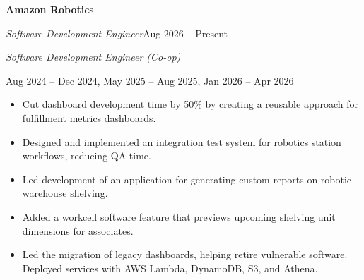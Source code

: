 \textbf{Amazon Robotics}\par
\textit{Software Development Engineer}\enspace\textbar\enspace Aug 2026 -- Present\par
\textit{Software Development Engineer (Co-op)}\par
Aug 2024 -- Dec 2024, May 2025 -- Aug 2025, Jan 2026 -- Apr 2026\par
\begin{itemize}
  \item Cut dashboard development time by 50\% by creating a reusable approach for fulfillment metrics dashboards.
  \item Designed and implemented an integration test system for robotics station workflows, reducing QA time.
  \item Led development of an application for generating custom reports on robotic warehouse shelving.
  \item Added a workcell software feature that previews upcoming shelving unit dimensions for associates.
  \item Led the migration of legacy dashboards, helping retire vulnerable software. Deployed services with AWS Lambda, DynamoDB, S3, and Athena.
\end{itemize}

